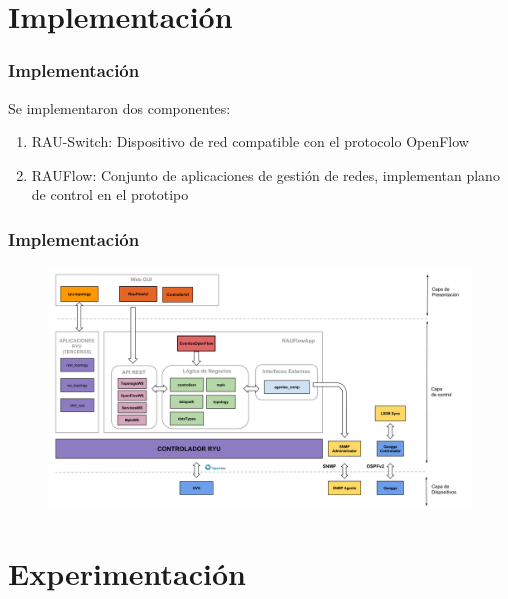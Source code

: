 \documentclass{beamer}
\begin{document}

\section{Implementaci\'on} 
\frame{\tableofcontents[currentsection]}

\begin{frame}
\frametitle{Implementaci\'on} 

Se implementaron dos componentes:

\begin{enumerate}
\item RAU-Switch: Dispositivo de red compatible con el protocolo OpenFlow
\item RAUFlow: Conjunto de aplicaciones de gesti\'on de redes, implementan plano de control en el prototipo
\end{enumerate}
\end{frame}

\begin{frame}
\frametitle{Implementaci\'on} 

\begin{figure}[H]
\centering
\includegraphics[width=1.0\textwidth]{imagenes/rauflowarquitectura.png}
\end{figure}

\end{frame}

\section{Experimentaci\'on} 
\frame{\tableofcontents[currentsection]}
\end{document}
